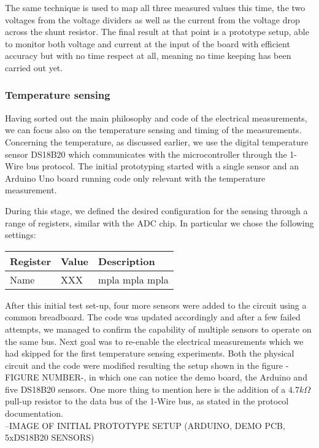 The same technique is used to map all three measured values this time, the two voltages from the voltage dividers as well as the current from the voltage drop across the shunt resistor. The final result at that point is a prototype setup, able to monitor both voltage and current at the input of the board with efficient accuracy but with no time respect at all, meaning no time keeping has been carried out yet.

\subsubsection{Temperature sensing}
Having sorted out the main philosophy and code of the electrical measurements, we can focus also on the temperature sensing and timing of the measurements. Concerning the temperature, as discussed earlier, we use the digital temperature sensor DS18B20 which communicates with the microcontroller through the 1-Wire bus protocol. The initial prototyping started with a single sensor and an Arduino Uno board running code only relevant with the temperature measurement. 

During this stage, we defined the desired configuration for the sensing through a range of registers, similar with the ADC chip. In particular we chose the following settings:

\begin{center}
\begin{tabular}{ l l l } 
 Register & Value & Description \\ \hline
 Name & XXX & mpla mpla mpla
\end{tabular}
\end{center}

After this initial test set-up, four more sensors were added to the circuit using a common breadboard. The code was updated accordingly and after a few failed attempts, we managed to confirm the capability of multiple sensors to operate on the same bus. Next goal was to re-enable the electrical measurements which we had skipped for the first temperature sensing experiments. Both the physical circuit and the code were modified resulting the setup shown in the figure -FIGURE NUMBER-, in which one can notice the demo board, the Arduino and five DS18B20 sensors. One more thing to mention here is the addition of a $4.7k\Omega$ pull-up resistor to the data bus of the 1-Wire bus, as stated in the protocol documentation.\\

--IMAGE OF INITIAL PROTOTYPE SETUP (ARDUINO, DEMO PCB, 5xDS18B20 SENSORS)\\

